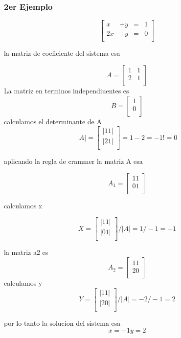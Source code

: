 \documentclass{article}
\begin{document}
\subsubsection{2er Ejemplo}

\[
    \begin{bmatrix}
        x & +y & = & 1  \\
        2x & +y & = & 0 \\
        \end{bmatrix}
\]

la matriz de coeficiente del sistema esa

\[
A =
\begin{bmatrix}
        1 & 1   \\
        2 & 1 \\
        \end{bmatrix}
\]
La matriz en terminos independiuentes es 
\[
B =
\begin{bmatrix}
        1    \\
        0  \\
        \end{bmatrix}
\]
calculamos el determinante de A
\[
| A | =
\begin{bmatrix}
      | 1 1 |      \\
      | 2 1 |    \\
        \end{bmatrix}
        = 1 -2 = -1 != 0
\]

aplicando la regla de crammer la matriz A esa

\[
A_1 =
\begin{bmatrix}
        1 1   \\
        0 1 \\
        \end{bmatrix}
\]

calculamos x

\[
X =
\begin{bmatrix}
    |1 1|       \\
    |0 1|     \\
\end{bmatrix}
/ | A |
= 1/ -1 = -1
\] 

la matriz a2 es
\[
    A_2 =
    \begin{bmatrix}
        1 1   \\
        2 0 \\
    \end{bmatrix}
\]
calculamos y
\[
   Y =
    \begin{bmatrix}
       | 1 1 |   \\
       | 2 0 | \\
    \end{bmatrix}
    / | A |
    = -2/-1 = 2
\]

por lo tanto la solucion del sistema esa
\[
    x = -1
    y = 2
\]
\end{document}
